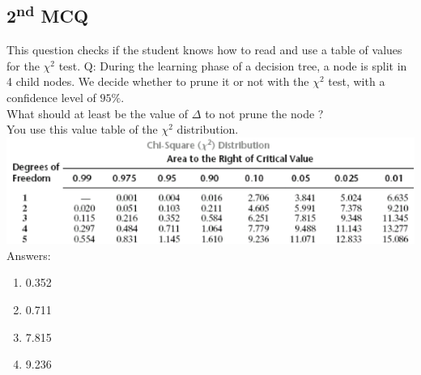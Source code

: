\documentclass[a4paper, 10pt]{article}
\begin{document}
\subsection{2\textsuperscript{nd} MCQ}
This question checks if the student knows how to read and use a table of values for the $\chi^2$ test.
Q: During the learning phase of a decision tree, a node is split in 4 child nodes. We decide 
whether to prune it or not with the $\chi^2$ test, with a confidence level of $95\%$.
\\
What should at least be the value of $\Delta$ to not prune the node ?
\\
You use this value table of the $\chi^2$ distribution.
\\
\includegraphics[scale=0.75]{chi2}
\\
Answers:
\begin{enumerate}
    \item 0.352
    \item 0.711
    \item 7.815
    \item 9.236 \textdagger


\end{enumerate}
\end{document}

